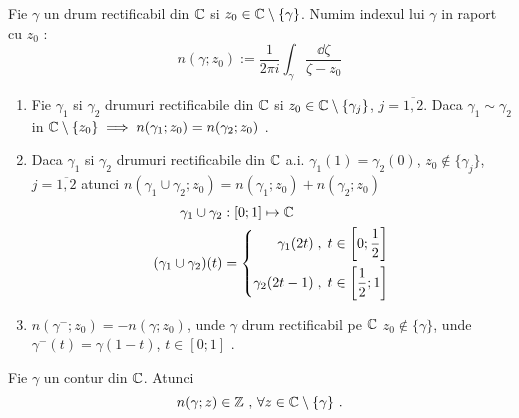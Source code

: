 \begin{definition}
    Fie $\gamma$ un drum rectificabil din $\mathbb{C}$ si $z_0 \in \mathbb{C} \setminus \{ \gamma \}$.
    Numim indexul lui $\gamma$ in raport cu $z_0$ :
    \begin{equation*}
        n(\gamma;z_0) := \frac{1}{2 \pi i} \int_{\gamma} \frac{\dd \zeta}{\zeta - z_0}
    \end{equation*}
\end{definition}

\begin{theorem}
    \begin{enumerate}
        \item Fie $\gamma_1$ si $\gamma_2$ drumuri rectificabile din $\mathbb{C}$
            si $z_0 \in \mathbb{C} \setminus \{\gamma_j\}$, $j=\overline{1,2}$. Daca $\gamma_1 \sim \gamma_2$
            in $\mathbb{C} \setminus\{z_0\} \implies n(\gamma_1;z_0) = n(\gamma_2;z_0)$ .
        \item Daca $\gamma_1$ si $\gamma_2$ drumuri rectificabile din $\mathbb{C}$ a.i.
            $\gamma_1(1) = \gamma_2(0)$, $z_0 \notin \{\gamma_j\}$, $j=\overline{1,2}$ atunci
            $n(\gamma_1 \cup \gamma_2; z_0) = n(\gamma_1; z_0) + n(\gamma_2; z_0)$
            \begin{align*}
                \gamma_1 \cup \gamma_2 &: [0;1] \mapsto \mathbb{C} \\
                (\gamma_1 \cup \gamma_2)(t) &=
                    \left \{
                    \begin{aligned}
                        \gamma_1(2t)\;,\; t \in \left [0; \frac{1}{2} \right] \\
                        \gamma_2(2t - 1)\;,\; t \in \left [\frac{1}{2}; 1 \right]
                    \end{aligned}
                    \right .
            \end{align*}
        \item $n(\gamma^{-}; z_0) = - n(\gamma; z_0)$, unde $\gamma$ drum rectificabil pe $\mathbb{C}$
            $z_0 \notin \{\gamma\}$, unde  $\gamma^{-}(t) = \gamma(1-t) $, $t \in [0;1]$ .
    \end{enumerate}
\end{theorem}

\begin{theorem}
    Fie $\gamma$ un contur din $\mathbb{C}$. Atunci
    \begin{equation*}
        n(\gamma;z)\in\mathbb{Z} \text{ , } \forall z \in \mathbb{C} \setminus \{\gamma\} \text{ .}
    \end{equation*}

\end{theorem}


